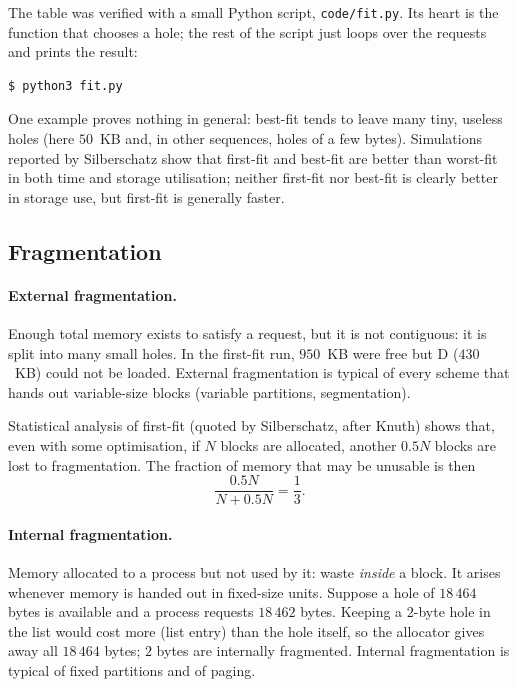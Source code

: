 \documentclass[11pt,a4paper]{article}
\begin{document}
The table was verified with a small Python script, \texttt{code/fit.py}. Its heart is the function that chooses a hole; the rest of the script just loops over the requests and prints the result:



\begin{lstlisting}[style=term]
$ python3 fit.py
\end{lstlisting}
\vspace{-0.9em}


One example proves nothing in general: best-fit tends to leave many tiny, useless holes (here $50$~KB and, in other sequences, holes of a few bytes). Simulations reported by Silberschatz show that first-fit and best-fit are better than worst-fit in both time and storage utilisation; neither first-fit nor best-fit is clearly better in storage use, but first-fit is generally faster.

\subsection{Fragmentation}

\paragraph{External fragmentation.} Enough total memory exists to satisfy a request, but it is not contiguous: it is split into many small holes. In the first-fit run, $950$~KB were free but D ($430$~KB) could not be loaded. External fragmentation is typical of every scheme that hands out variable-size blocks (variable partitions, segmentation).

\begin{keyidea}
Statistical analysis of first-fit (quoted by Silberschatz, after Knuth) shows that, even with some optimisation, if $N$ blocks are allocated, another $0.5N$ blocks are lost to fragmentation. The fraction of memory that may be unusable is then
\[
\frac{0.5N}{N + 0.5N} = \frac{1}{3}.
\]
\end{keyidea}

\paragraph{Internal fragmentation.} Memory allocated to a process but not used by it: waste \emph{inside} a block. It arises whenever memory is handed out in fixed-size units. Suppose a hole of $18\,464$ bytes is available and a process requests $18\,462$ bytes. Keeping a $2$-byte hole in the list would cost more (list entry) than the hole itself, so the allocator gives away all $18\,464$ bytes; $2$ bytes are internally fragmented. Internal fragmentation is typical of fixed partitions and of paging.
\end{document}
